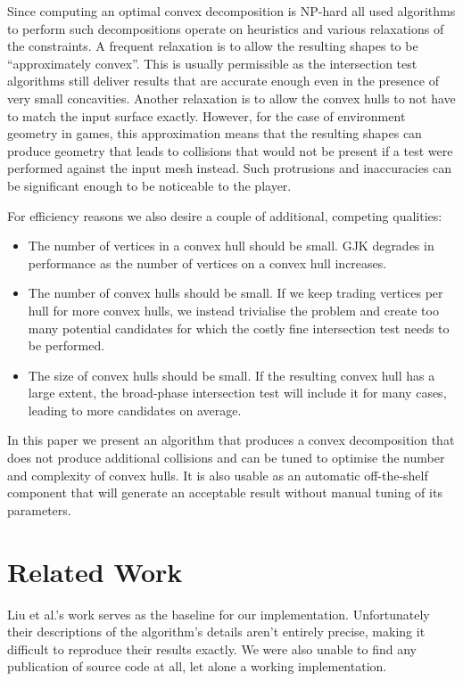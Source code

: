 \documentclass[format=sigconf]{acmart}
\begin{document}
Since computing an optimal convex decomposition is NP-hard\cite{1056648} all used algorithms to perform such decompositions operate on heuristics and various relaxations of the constraints. A frequent relaxation is to allow the resulting shapes to be ``approximately convex''. This is usually permissible as the intersection test algorithms still deliver results that are accurate enough even in the presence of very small concavities. Another relaxation is to allow the convex hulls to not have to match the input surface exactly. However, for the case of environment geometry in games, this approximation means that the resulting shapes can produce geometry that leads to collisions that would not be present if a test were performed against the input mesh instead. Such protrusions and inaccuracies can be significant enough to be noticeable to the player.

For efficiency reasons we also desire a couple of additional, competing qualities:
\begin{itemize}
\item The number of vertices in a convex hull should be small. GJK degrades in performance as the number of vertices on a convex hull increases.
\item The number of convex hulls should be small. If we keep trading vertices per hull for more convex hulls, we instead trivialise the problem and create too many potential candidates for which the costly fine intersection test needs to be performed.
\item The size of convex hulls should be small. If the resulting convex hull has a large extent, the broad-phase intersection test will include it for many cases, leading to more candidates on average.
\end{itemize}

In this paper we present an algorithm that produces a convex decomposition that does not produce additional collisions and can be tuned to optimise the number and complexity of convex hulls. It is also usable as an automatic off-the-shelf component that will generate an acceptable result without manual tuning of its parameters.

\section{Related Work}\label{relatedwork}
Liu et al.\cite{liu2008convex}'s work serves as the baseline for our implementation. Unfortunately their descriptions of the algorithm's details aren't entirely precise, making it difficult to reproduce their results exactly. We were also unable to find any publication of source code at all, let alone a working implementation.
\end{document}
